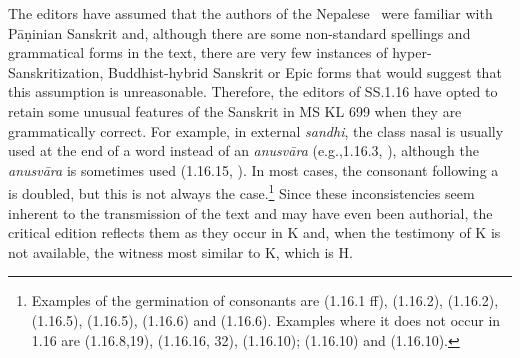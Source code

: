 The editors have assumed that the authors of the Nepalese \SS\ were familiar 
with Pāṇinian Sanskrit and, although there are some non-standard spellings and 
grammatical forms in the text, there are very few instances of 
hyper-Sanskritization, Buddhist-hybrid Sanskrit or Epic forms that would suggest 
that this assumption is unreasonable. Therefore, the editors of SS.1.16 have 
opted to retain some unusual features of the Sanskrit in MS KL 699 when they are 
grammatically correct. For example, in external \emph{sandhi}, the class nasal is 
usually used at the end of a word instead of an \emph{anusvāra} (e.g.,1.16.3, 
), although the \emph{anusvāra} is sometimes used 
(1.16.15, ). In most cases, the consonant following a 
 is doubled, but this is not always the case.\footnote{Examples of 
the germination of consonants are  (1.16.1 ff),  
(1.16.2),  (1.16.2),  (1.16.5),  (1.16.5),  (1.16.6) and  (1.16.6). 
Examples where it does not occur in 1.16 are   (1.16.8,19), 
 (1.16.16, 32),  (1.16.10);  (1.16.10) 
and  (1.16.10).} Since these 
inconsistencies seem inherent to the transmission of the text and may have even 
been authorial, the critical edition reflects them as they occur in K and, when the 
testimony of K is not available, the witness most similar to K, which is H.





